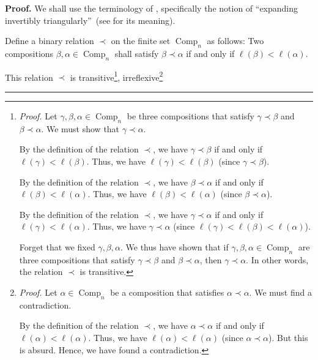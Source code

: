 \documentclass[numbers=enddot,12pt,final,onecolumn,notitlepage]{scrartcl}%
\theoremstyle{definition}
\newenvironment{proof}[1][Proof]{\noindent\textbf{#1.} }{\ \rule{0.5em}{0.5em}}
\newenvironment{verlong}{}{}
\begin{document}
\begin{verlong}
\begin{proof}
We shall use the terminology of \cite[\S 11.1]{GriRei}, specifically the
notion of \textquotedblleft expanding invertibly
triangularly\textquotedblright\ (see \cite[Definition 11.1.16 (b)]{GriRei} for
its meaning).

Define a binary relation $\prec$ on the finite set $\operatorname*{Comp}%
\nolimits_{n}$ as follows: Two compositions $\beta,\alpha\in
\operatorname*{Comp}\nolimits_{n}$ shall satisfy $\beta\prec\alpha$ if and
only if $\ell\left(  \beta\right)  <\ell\left(  \alpha\right)  $.

This relation $\prec$ is transitive\footnote{\textit{Proof.} Let $\gamma
,\beta,\alpha\in\operatorname*{Comp}\nolimits_{n}$ be three compositions that
satisfy $\gamma\prec\beta$ and $\beta\prec\alpha$. We must show that
$\gamma\prec\alpha$.
\par
By the definition of the relation $\prec$, we have $\gamma\prec\beta$ if and
only if $\ell\left(  \gamma\right)  <\ell\left(  \beta\right)  $. Thus, we
have $\ell\left(  \gamma\right)  <\ell\left(  \beta\right)  $ (since
$\gamma\prec\beta$).
\par
By the definition of the relation $\prec$, we have $\beta\prec\alpha$ if and
only if $\ell\left(  \beta\right)  <\ell\left(  \alpha\right)  $. Thus, we
have $\ell\left(  \beta\right)  <\ell\left(  \alpha\right)  $ (since
$\beta\prec\alpha$).
\par
By the definition of the relation $\prec$, we have $\gamma\prec\alpha$ if and
only if $\ell\left(  \gamma\right)  <\ell\left(  \alpha\right)  $. Thus, we
have $\gamma\prec\alpha$ (since $\ell\left(  \gamma\right)  <\ell\left(
\beta\right)  <\ell\left(  \alpha\right)  $).
\par
Forget that we fixed $\gamma,\beta,\alpha$. We thus have shown that if
$\gamma,\beta,\alpha\in\operatorname*{Comp}\nolimits_{n}$ are three
compositions that satisfy $\gamma\prec\beta$ and $\beta\prec\alpha$, then
$\gamma\prec\alpha$. In other words, the relation $\prec$ is transitive.},
irreflexive\footnote{\textit{Proof.} Let $\alpha\in\operatorname*{Comp}%
\nolimits_{n}$ be a composition that satisfies $\alpha\prec\alpha$. We must
find a contradiction.
\par
By the definition of the relation $\prec$, we have $\alpha\prec\alpha$ if and
only if $\ell\left(  \alpha\right)  <\ell\left(  \alpha\right)  $. Thus, we
have $\ell\left(  \alpha\right)  <\ell\left(  \alpha\right)  $ (since
$\alpha\prec\alpha$). But this is absurd. Hence, we have found a
contradiction.
\par
}
\end{proof}
\end{verlong}
\end{document}

